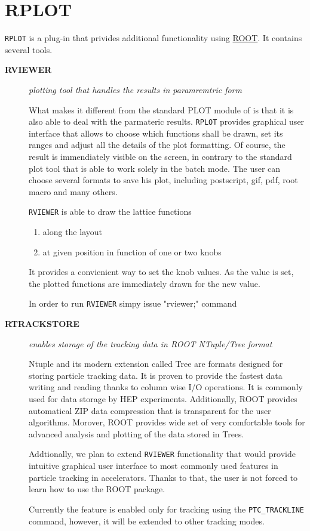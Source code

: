 
\section{RPLOT}
\label{sec:rplot}

\texttt{RPLOT} is a \madx plug-in that privides additional functionality
using \href{http://root.cern.ch}{ROOT}.  It contains several tools.

\begin{description}

\item[\textbf{ RVIEWER }] 
\textit{ plotting tool that handles the results in paramremtric form }

What makes it different from the standard PLOT module of \madx is
that it is also able to deal with the parmateric results. \texttt{RPLOT} 
provides graphical user interface that allows to choose which
functions shall be drawn, set its ranges and adjust all the details
of the plot formatting. Of course, the result is immendiately
visible on the screen, in contrary to the standard plot tool that is
able to work solely in the batch mode. The user can choose several
formats to save his plot, including postscript, gif, pdf, root macro and
many others.       

\texttt{RVIEWER} is able to draw the lattice functions     
\begin{enumerate}
   \item  along the layout 
   \item  at given position in function of one or two knobs  
\end{enumerate}     

It provides a convienient way to set the knob values. As the value is
set, the plotted functions are immediately drawn for the new value.            

In order to run \texttt{RVIEWER} simpy issue "rviewer;" command        

\item[\textbf{RTRACKSTORE}] 
\textit{enables storage of the tracking data in ROOT NTuple/Tree format}

Ntuple and its modern extension called Tree are formats designed
for storing particle tracking data. It is proven to provide the
fastest data writing and reading thanks to column wise I/O
operations. It is commonly used for data storage by HEP
experiments. Additionally, ROOT provides automatical ZIP data
compression that is transparent for the user algorithms.
Morover, ROOT provides wide set of very comfortable tools for
advanced analysis and plotting of the data stored in Trees.    

Addtionally, we plan to extend \texttt{RVIEWER} functionality that would
provide intuitive graphical user interface to most commonly used
features in particle tracking in accelerators. Thanks to that, the user is
not forced to learn how to use the ROOT package.    

Currently the feature is enabled only for tracking using the
\texttt{PTC\_TRACKLINE} command, however, it will be extended to other
tracking modes.           
\end{description}

